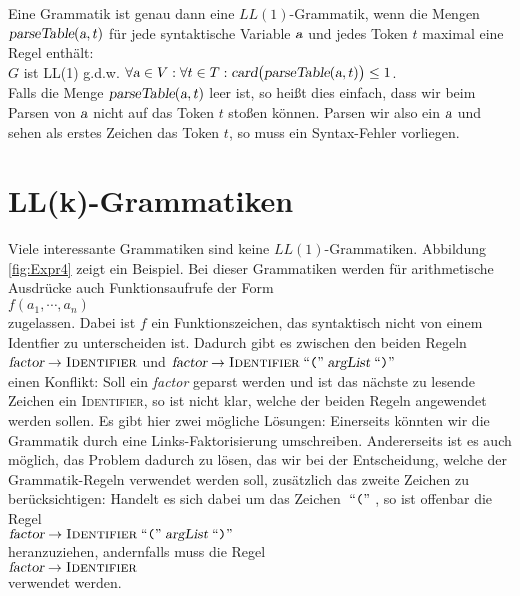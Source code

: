 Eine Grammatik ist genau dann eine $LL(1)$-Grammatik, wenn die Mengen
$\textsl{parseTable}(\textsl{a},t)$ für jede syntaktische Variable $\textsl{a}$ und jedes Token $t$ maximal
eine Regel enthält:
\\[0.2cm]
\hspace*{1.3cm} $G$ ist LL(1) \quad g.d.w. \quad  
$\forall \textsl{a} \in V: \forall t \in T: \textsl{card}\bigl(\textsl{parseTable}(\textsl{a},t)\bigr) \leq 1$.
\\[0.2cm]
Falls die Menge $\textsl{parseTable}(\textsl{a},t)$ leer ist, so heißt dies einfach, dass wir beim
Parsen von $\textsl{a}$ nicht auf das Token $t$ stoßen können.  Parsen wir also ein $\textsl{a}$ und sehen
als erstes Zeichen das Token $t$, so muss ein Syntax-Fehler vorliegen.  

\section{LL(k)-Grammatiken}
Viele interessante Grammatiken sind keine $LL(1)$-Grammatiken.
Abbildung \ref{fig:Expr4} zeigt ein Beispiel.  Bei dieser Grammatiken werden für arithmetische
Ausdrücke auch Funktionsaufrufe der Form
\\[0.2cm]
\hspace*{1.3cm}
$f(a_1, \cdots, a_n)$
\\[0.2cm]
zugelassen.  Dabei ist $f$ ein Funktionszeichen, das syntaktisch nicht von einem Identfier zu
unterscheiden ist.  Dadurch gibt es zwischen den beiden Regeln
\\[0.2cm]
\hspace*{1.3cm}
$\textsl{factor} \rightarrow \textsc{Identifier}$ \quad und \quad
$\textsl{factor} \rightarrow \textsc{Identifier} \;\mbox{``\texttt{(}''}\; \textsl{argList} \;\mbox{``\texttt{)}''}\;$ 
\\[0.2cm]
einen Konflikt:  Soll ein \textsl{factor} geparst werden und ist das nächste zu lesende Zeichen ein 
\textsc{Identifier}, so ist nicht klar, welche der beiden Regeln angewendet werden sollen.
Es gibt hier zwei mögliche Lösungen:  Einerseits könnten wir die Grammatik durch eine
Links-Faktorisierung umschreiben.  Andererseits ist es auch möglich, das Problem dadurch zu lösen,
das wir bei der Entscheidung, welche der Grammatik-Regeln verwendet werden soll, zusätzlich das
zweite Zeichen zu berücksichtigen:  Handelt es sich dabei um das Zeichen $\;\mbox{``\texttt{(}''}\;$, so ist offenbar die Regel
\\[0.2cm]
\hspace*{1.3cm}
$\textsl{factor} \rightarrow \textsc{Identifier} \;\mbox{``\texttt{(}''}\; \textsl{argList} \;\mbox{``\texttt{)}''}\;$ 
\\[0.2cm]
heranzuziehen, andernfalls muss die Regel
\\[0.2cm]
\hspace*{1.3cm}
$\textsl{factor} \rightarrow \textsc{Identifier}$ 
\\[0.2cm]
verwendet werden.

